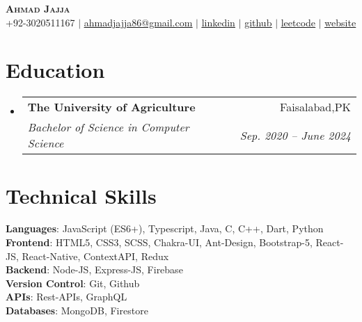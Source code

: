 \documentclass[letterpaper,11pt]{article}
\makeatletter
\newcommand{\resumeSubheading}[4]{
  \vspace{-2pt}\item
    \begin{tabular*}{0.97\textwidth}[t]{l@{\extracolsep{\fill}}r}
      \textbf{#1} & #2 \\
      \textit{\small#3} & \textit{\small #4} \\
    \end{tabular*}\vspace{-7pt}
}
\newcommand{\resumeSubHeadingListStart}{\begin{itemize}[leftmargin=0.15in, label={}]}
\newcommand{\resumeSubHeadingListEnd}{\end{itemize}}
\makeatother
\begin{document}

\begin{center}
    \textbf{\Huge \scshape Ahmad Jajja} \\ \vspace{1pt}
    \small +92-3020511167 $|$ 
    \href{mailto:ahmadjajja86@gmail.com}{\underline{ahmadjajja86@gmail.com}} $|$ 
    \href{https://www.linkedin.com/in/ahmad-jajja-ba8b34210/}{\underline{linkedin}} $|$
    \href{https://github.com/Ahmadjajja}{\underline{github}} $|$
    \href{https://leetcode.com/ahmadjajja86/}{\underline{leetcode}} $|$
    \href{https://ahmad-jajja.netlify.app/}{\underline{website}}
\end{center}

\section{Education}
  \resumeSubHeadingListStart
    \resumeSubheading
      {The University of Agriculture}{Faisalabad,PK}
      {Bachelor of Science in Computer Science}{Sep. 2020 -- June 2024}
  \resumeSubHeadingListEnd
%
\section{Technical Skills}
 \begin{itemize}[leftmargin=0.15in, label={}]
    \small{\item{
     \textbf{Languages}{: JavaScript (ES6+), Typescript, Java, C, C++, Dart, Python } \\
     \textbf{Frontend}{: HTML5, CSS3, SCSS, Chakra-UI, Ant-Design, Bootstrap-5, React-JS, React-Native, ContextAPI, Redux} \\
     \textbf{Backend}{: Node-JS, Express-JS, Firebase} \\
     \textbf{Version Control}{: Git, Github} \\
     \textbf{APIs}{: Rest-APIs, GraphQL} \\
     \textbf{Databases}{: MongoDB, Firestore}\\
    }}
 \end{itemize}
\end{document}
